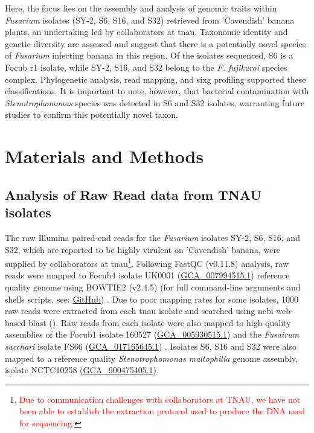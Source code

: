 Here, the focus lies on the assembly and analysis of genomic traits within \textit{Fusarium} isolates (SY-2, S6, S16, and S32) retrieved from 'Cavendish' banana plants, an undertaking led by collaborators at \ac{tnau}. Taxonomic identity and genetic diversity are assessed and suggest that there is a potentially novel species of \textit{Fusarium} infecting banana in this region. Of the isolates sequenced, S6 is a \ac{Focub} \ac{r1} isolate, while SY-2, S16, and S32 belong to the \textit{F. fujikuroi} species complex. Phylogenetic analysis, read mapping, and \ac{sixg} profiling supported these classifications. It is important to note, however, that bacterial contamination with \textit{Stenotrophomonas} species was detected in S6 and S32 isolates, warranting future studies to confirm this potentially novel taxon.

\newpage

\section{Materials and Methods}

 \subsection{Analysis of Raw Read data from TNAU isolates}

The raw Illumina paired-end reads for the \textit{Fusarium} isolates SY-2, S6, S16, and S32, which are reported to be highly virulent on 'Cavendish' banana, were supplied by collaborators at \ac{tnau}\footnote{\textcolor{red}{Due to communication challenges with collaborators at TNAU, we have not been able to establish the extraction protocol used to produce the DNA used for sequencing.}}. Following FastQC (v0.11.8)
\parencite{Andrews2010} analysis, raw reads were mapped to \ac{Focub4}  isolate UK0001 (\href{https://www.ncbi.nlm.nih.gov/datasets/genome/GCA_007994515.1/}{GCA\_007994515.1}) \parencite{Warmington2019} reference quality genome using BOWTIE2 (v2.4.5) \parencite{Langmead2012} (for full command-line arguments and shells scripts, see: \href{https://github.com/JamiePike/NewTools-Project/blob/master/docs/Assembly/AssemblyNotes.md}{GitHub}) . Due to poor mapping rates for some isolates, 1000 raw reads were extracted from each \ac{tnau} isolate and searched using \ac{ncbi} web-based \acl{blast} (\textcite{Nih2014}). Raw reads from each isolate were also mapped to high-quality assemblies of the \ac{Focub1} isolate 160527 (\href{https://www.ncbi.nlm.nih.gov/datasets/genome/GCA_005930515.1/}{GCA\_005930515.1}) \parencite{Asai2019} and the \textit{Fusairum sacchari} isolate FS66 (\href{https://www.ncbi.nlm.nih.gov/datasets/genome/GCA_017165645.1/}{GCA\_017165645.1}) \parencite{Cui2021}. Isolates S6, S16 and S32 were also mapped to a reference quality \textit{Stenotrophomonas maltophilia} genome assembly, isolate NCTC10258 (\href{https://www.ncbi.nlm.nih.gov/datasets/genome/GCF_900475405.1/}{GCA\_900475405.1}). 

